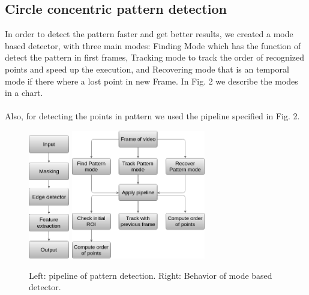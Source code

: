 \documentclass[journal]{IEEEtran}
\begin{document}
\subsection{Circle concentric pattern detection}
In order to detect the pattern faster and get better results, we created a mode based detector, with three main modes: Finding Mode which has the function of detect the pattern in first frames, Tracking mode to track the order of recognized points and speed up the execution, and Recovering mode that is an temporal mode if there where a lost point in new Frame. In Fig. 2 we describe the modes in a chart.
\\
\\
Also, for detecting the points in pattern we used the pipeline specified in Fig. 2.
\begin{figure}[H]
\centering
\includegraphics[width=0.7in]{_img/img_report4_pipeline_detector.png}
\includegraphics[width=2.3in]{_img/img_report4_pipeline_modes.png}
\caption{Left: pipeline of pattern detection. Right: Behavior of mode based detector.}
\end{figure}
\end{document}
